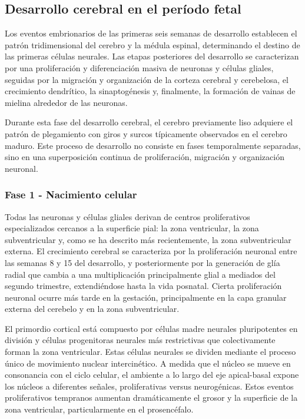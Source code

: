 \documentclass[11pt,letterpaper]{report}
\begin{document}
\subsection{Desarrollo cerebral en el período fetal}
Los eventos embrionarios de las primeras seis semanas de desarrollo establecen
el patrón tridimensional del cerebro y la médula espinal, determinando el
destino de las primeras células neurales. Las etapas posteriores del desarrollo
se caracterizan por una proliferación y diferenciación masiva de neuronas y
células gliales, seguidas por la migración y organización de la corteza
cerebral y cerebelosa, el crecimiento dendrítico, la sinaptogénesis y,
finalmente, la formación de vainas de mielina alrededor de las neuronas.
\cite{Polin124}

Durante esta fase del desarrollo cerebral, el cerebro previamente liso adquiere
el patrón de plegamiento con giros y surcos típicamente observados en el
cerebro maduro. Este proceso de desarrollo no consiste en fases temporalmente
separadas, sino en una superposición continua de proliferación, migración y
organización neuronal. \cite{Gibb2018}

\subsubsection{Fase 1 - Nacimiento celular}
Todas las neuronas y células gliales derivan de centros proliferativos
especializados cercanos a la superficie pial: la zona ventricular, la zona
subventricular y, como se ha descrito más recientemente, la zona subventricular
externa. El crecimiento cerebral se caracteriza por la proliferación neuronal
entre las semanas 8 y 15 del desarrollo, y posteriormente por la generación de
glía radial que cambia a una multiplicación principalmente glial a mediados del
segundo trimestre, extendiéndose hasta la vida posnatal. Cierta proliferación
neuronal ocurre más tarde en la gestación, principalmente en la capa granular
externa del cerebelo y en la zona subventricular. \cite{Polin124} 

El primordio cortical está compuesto por células madre neurales pluripotentes
en división y células progenitoras neurales más restrictivas que colectivamente
forman la zona ventricular. Estas células neurales se dividen mediante el
proceso único de movimiento nuclear intercinético. A medida que el núcleo se
mueve en consonancia con el ciclo celular, el ambiente a lo largo del eje
apical-basal expone los núcleos a diferentes señales, proliferativas versus
neurogénicas. Estos eventos proliferativos tempranos aumentan dramáticamente el
grosor y la superficie de la zona ventricular, particularmente en el
prosencéfalo. \cite{Polin124}
\end{document}
